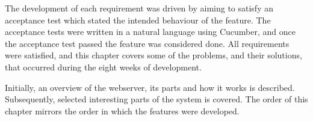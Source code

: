 
The development of each requirement was driven by
aiming to satisfy an acceptance test which stated the intended behaviour of the feature.
The acceptance tests were written in a natural language using Cucumber, and
once the acceptance test passed the feature was considered done. All
requirements were satisfied, and this chapter covers some of the problems, and
their solutions, that occurred during the eight weeks of development.

Initially, an overview of the webserver, its parts and how it works is
described. Subsequently, selected interesting parts of the system is covered.
The order of this chapter mirrors the order in which the features were
developed.
